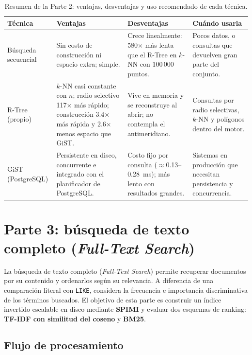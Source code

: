 \documentclass[11pt,a4paper]{article}
\begin{document}
\begin{table}[H]
  \centering
  \small
  \begin{tabular}{@{}p{2.4cm}p{4.4cm}p{4.4cm}p{4.0cm}@{}}
    \toprule
    \textbf{Técnica} & \textbf{Ventajas} & \textbf{Desventajas} & \textbf{Cuándo usarla} \\
    \midrule
    Búsqueda secuencial & Sin costo de construcción ni espacio extra; simple. & Crece linealmente: 580$\times$ más lenta que el R-Tree en $k$-NN con 100\,000 puntos. & Pocos datos, o consultas que devuelven gran parte del conjunto. \\
    R-Tree (propio) & $k$-NN casi constante con $n$; radio selectivo 117$\times$ más rápido; construcción 3.4$\times$ más rápida y 2.6$\times$ menos espacio que GiST. & Vive en memoria y se reconstruye al abrir; no contempla el antimeridiano. & Consultas por radio selectivas, $k$-NN y polígonos dentro del motor. \\
    GiST (PostgreSQL) & Persistente en disco, concurrente e integrado con el planificador de PostgreSQL. & Costo fijo por consulta ($\approx$0.13--0.28~ms); más lento con resultados grandes. & Sistemas en producción que necesitan persistencia y concurrencia. \\
    \bottomrule
  \end{tabular}
  \caption{Resumen de la Parte 2: ventajas, desventajas y uso recomendado de cada técnica.}
  \label{tab:resumen-parte2}
\end{table}

\section{Parte 3: búsqueda de texto completo (\emph{Full-Text Search})}

La búsqueda de texto completo (\emph{Full-Text Search}) permite recuperar documentos por su contenido y ordenarlos según su relevancia. A diferencia de una comparación literal con \texttt{LIKE}, considera la frecuencia e importancia discriminativa de los términos buscados. El objetivo de esta parte es construir un índice invertido escalable en disco mediante \textbf{SPIMI} y evaluar dos esquemas de ranking: \textbf{TF-IDF con similitud del coseno} y \textbf{BM25}.

\subsection{Flujo de procesamiento}
\end{document}

